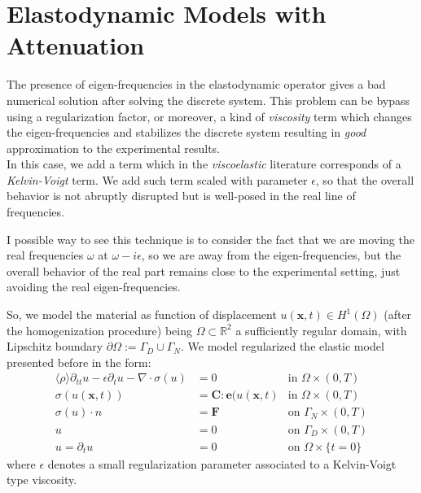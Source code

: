 \section{Elastodynamic Models with Attenuation}
The presence of eigen-frequencies in the elastodynamic operator gives a bad numerical solution after solving the discrete system. This problem can be bypass using a regularization factor, or moreover, a kind of \textit{viscosity} term which changes the eigen-frequencies and stabilizes the discrete system resulting in \textit{good} approximation to the experimental results.\\
In this case, we add a term which in the \textit{viscoelastic} literature corresponds of a \textit{Kelvin-Voigt} term. We add such term scaled with parameter $\epsilon$, so that the overall behavior is not abruptly disrupted but is well-posed in the real line of frequencies.

\begin{rem}
I possible way to see this technique is to consider the fact that we are moving the real frequencies $\omega$ at $\omega - i\epsilon$, so we are away from the eigen-frequencies, but the overall behavior of the real part remains close to the experimental setting, just avoiding the real eigen-frequencies.
\end{rem}

So, we model the material as function of displacement $u(\mathbf{x},t) \in H^{1}(\Omega)$ (after the homogenization procedure) being $\Omega \subset \mathbb{R}^2$ a sufficiently regular domain, with Lipschitz boundary $\partial \Omega := \Gamma_D \cup \Gamma_N$. 
We model regularized the elastic model presented before in the form:
\begin{align*}
    \langle \rho \rangle \partial_{tt} u - \epsilon \partial_{t} u - \nabla \cdot \sigma(u) & = 0 & \text{in } \Omega \times (0,T) \\
    \sigma(u(\mathbf{x},t)) & =  \mathbf{C}:\mathbf{e}(u(\mathbf{x},t)  & \text{in }\Omega \times (0,T)\\
    \sigma(u)\cdot n & = \mathbf{F} & \text{on }\Gamma_N\times (0,T) \\
    u & = 0 & \text{on }\Gamma_D \times (0,T) \\
    u = \partial_t u & = 0& \text{on } \Omega \times \{t=0\}
\end{align*}
where $\epsilon$ denotes a small regularization parameter associated to a Kelvin-Voigt type viscosity. 
